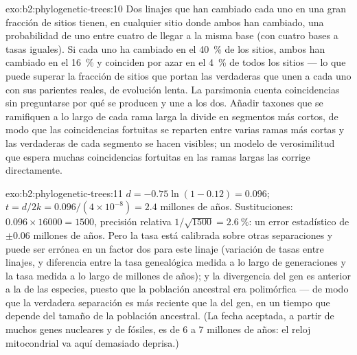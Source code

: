 \begin{solution}{exo:b2:phylogenetic-trees:10}
Dos linajes que han cambiado cada uno en una gran fracción de sitios
tienen, en cualquier sitio donde ambos han cambiado, una probabilidad de
uno entre cuatro de llegar a la misma base (con cuatro bases a tasas
iguales). Si cada uno ha cambiado en el \qty{40}{\%} de los sitios, ambos
han cambiado en el \qty{16}{\%} y coinciden por azar en el \qty{4}{\%} de
todos los sitios --- lo que puede superar la fracción de sitios que portan
las  verdaderas que unen a cada uno con sus parientes reales,
de evolución lenta. La parsimonia cuenta coincidencias sin preguntarse por
qué se producen y une a los dos. Añadir taxones que se ramifiquen a lo
largo de cada rama larga la divide en segmentos más cortos, de modo que
las coincidencias fortuitas se reparten entre varias ramas más cortas y las
 verdaderas de cada segmento se hacen visibles; un modelo de
verosimilitud que espera muchas coincidencias fortuitas en las ramas
largas las corrige directamente.
\end{solution}

\begin{solution}{exo:b2:phylogenetic-trees:11}
$d = -0.75\ln(1 - 0.12) = 0.096$; $t = d/2k = 0.096/(4\times 10^{-8})
= 2.4$ millones de años. Sustituciones: $0.096\times \num{16000} =
1500$, precisión relativa $1/\sqrt{1500} = \qty{2.6}{\%}$: un error
estadístico de $\pm 0.06$ millones de años. Pero la tasa está calibrada
sobre otras separaciones y puede ser errónea en un factor dos para este
linaje (variación de tasas entre linajes, y diferencia entre la tasa
genealógica medida a lo largo de generaciones y la tasa medida a lo largo
de millones de años); y la divergencia del gen es anterior a la de las
especies, puesto que la población ancestral era polimórfica --- de modo que
la verdadera separación es más reciente que la del gen, en un tiempo que
depende del tamaño de la población ancestral. (La fecha aceptada, a partir
de muchos genes nucleares y de fósiles, es de 6 a 7 millones de años: el
reloj mitocondrial va aquí demasiado deprisa.)
\end{solution}

